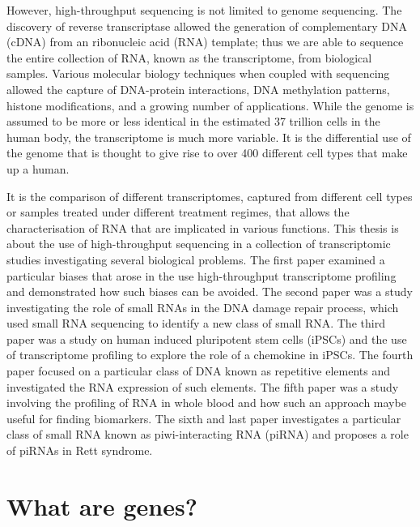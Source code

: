 However, high-throughput sequencing is not limited to genome sequencing. The discovery of reverse transcriptase\cite{pmid4316300, pmid4316301} allowed the generation of complementary DNA (cDNA) from an ribonucleic acid (RNA) template; thus we are able to sequence the entire collection of RNA, known as the transcriptome, from biological samples. Various molecular biology techniques when coupled with sequencing allowed the capture of DNA-protein interactions, DNA methylation patterns, histone modifications, and a growing number of applications\cite{applicationsofsequencing}. While the genome is assumed to be more or less identical in the estimated 37 trillion cells in the human body\cite{pmid23829164}, the transcriptome is much more variable. It is the differential use of the genome that is thought to give rise to over 400 different cell types\cite{pmid16790079} that make up a human.

It is the comparison of different transcriptomes, captured from different cell types or samples treated under different treatment regimes, that allows the characterisation of RNA that are implicated in various functions. This thesis is about the use of high-throughput sequencing in a collection of transcriptomic studies investigating several biological problems. The first paper examined a particular biases that arose in the use high-throughput transcriptome profiling and demonstrated how such biases can be avoided\cite{Tang01022013}. The second paper was a study investigating the role of small RNAs in the DNA damage repair process, which used small RNA sequencing to identify a new class of small RNA\cite{francia2012site}. The third paper was a study on human induced pluripotent stem cells (iPSCs) and the use of transcriptome profiling to explore the role of a chemokine in iPSCs. The fourth paper focused on a particular class of DNA known as repetitive elements and investigated the RNA expression of such elements. The fifth paper was a study involving the profiling of RNA in whole blood and how such an approach maybe useful for finding biomarkers. The sixth and last paper investigates a particular class of small RNA known as piwi-interacting RNA (piRNA) and proposes a role of piRNAs in Rett syndrome.

\section{What are genes?}

